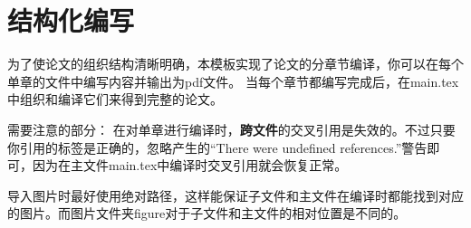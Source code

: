 \documentclass[supercite,fontset=windows]{../../upcthesis}
\begin{document}
\section{结构化编写}

为了使论文的组织结构清晰明确，本模板实现了论文的分章节编译，你可以在每个单章的文件中编写内容并输出为pdf文件。
当每个章节都编写完成后，在main.tex中组织和编译它们来得到完整的论文。




需要注意的部分：
在对单章进行编译时，\textbf{跨文件}的交叉引用是失效的。不过只要你引用的标签是正确的，忽略产生的“There were undefined references.”警告即可，因为在主文件main.tex中编译时交叉引用就会恢复正常。

导入图片时最好使用绝对路径，这样能保证子文件和主文件在编译时都能找到对应的图片。而图片文件夹figure对于子文件和主文件的相对位置是不同的。
\end{document}
